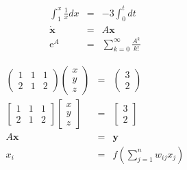 \documentclass[a4paper,11pt]{jarticle}
\begin{document}
\vskip 1mm

\begin{eqnarray}
\int_1^{x} \frac{1}{x}dx   & = &  - 3 \int_0^t dt \\
\dot {\bm{x}} & = & A \bm{x} \\
\mathrm{e}^{A} & = & \sum_{k=0}^\infty \frac{A^k}{k!}
\end{eqnarray}

\begin{eqnarray}
\begin{pmatrix}
1 & 1 & 1 \\
2 & 1 & 2
\end{pmatrix}
\begin{pmatrix}
x \\
y \\
z
\end{pmatrix} 
& = &
\begin{pmatrix}
3 \\
2
\end{pmatrix}
\\
\begin{bmatrix}
1 & 1 & 1 \\
2 & 1 & 2
\end{bmatrix}
\begin{bmatrix}
x \\
y \\
z
\end{bmatrix} 
& = &
\begin{bmatrix}
3 \\
2
\end{bmatrix}
\\
A \bm{x}  & = & \bm{y}
\\
x_i & = & f(\sum_{j=1}^n w_{ij}  x_j )
\end{eqnarray}
\end{document}
